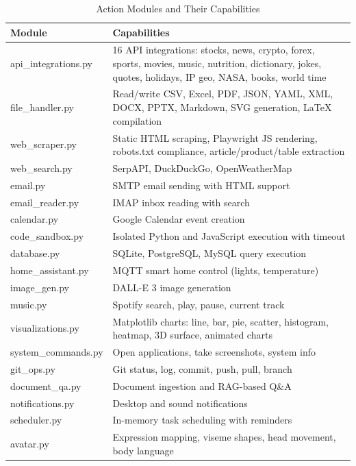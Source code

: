 \documentclass[12pt,a4paper,twoside]{report}
\begin{document}
\begin{table}[H]
\centering
\begin{tabularx}{\textwidth}{|l|X|}
\hline
\rowcolor{phiblue!20}
\textbf{Module} & \textbf{Capabilities} \\
\hline
api\_integrations.py & 16 API integrations: stocks, news, crypto, forex, sports, movies, music, nutrition, dictionary, jokes, quotes, holidays, IP geo, NASA, books, world time \\
\hline
file\_handler.py & Read/write CSV, Excel, PDF, JSON, YAML, XML, DOCX, PPTX, Markdown, SVG generation, LaTeX compilation \\
\hline
web\_scraper.py & Static HTML scraping, Playwright JS rendering, robots.txt compliance, article/product/table extraction \\
\hline
web\_search.py & SerpAPI, DuckDuckGo, OpenWeatherMap \\
\hline
email.py & SMTP email sending with HTML support \\
\hline
email\_reader.py & IMAP inbox reading with search \\
\hline
calendar.py & Google Calendar event creation \\
\hline
code\_sandbox.py & Isolated Python and JavaScript execution with timeout \\
\hline
database.py & SQLite, PostgreSQL, MySQL query execution \\
\hline
home\_assistant.py & MQTT smart home control (lights, temperature) \\
\hline
image\_gen.py & DALL-E 3 image generation \\
\hline
music.py & Spotify search, play, pause, current track \\
\hline
visualizations.py & Matplotlib charts: line, bar, pie, scatter, histogram, heatmap, 3D surface, animated charts \\
\hline
system\_commands.py & Open applications, take screenshots, system info \\
\hline
git\_ops.py & Git status, log, commit, push, pull, branch \\
\hline
document\_qa.py & Document ingestion and RAG-based Q\&A \\
\hline
notifications.py & Desktop and sound notifications \\
\hline
scheduler.py & In-memory task scheduling with reminders \\
\hline
avatar.py & Expression mapping, viseme shapes, head movement, body language \\
\hline
\end{tabularx}
\caption{Action Modules and Their Capabilities}
\end{table}
\end{document}
